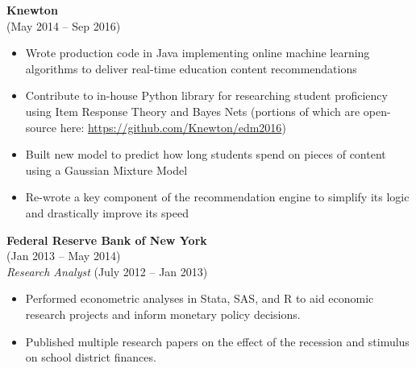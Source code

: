 \documentclass{res}
\begin{document}
\begin{resume}
  {\bf Knewton} \\ 
   \hspace{3pt} (May 2014 -- Sep 2016)
  \begin{itemize} \itemsep 2.0pt %
  \item Wrote production code in Java implementing online machine learning algorithms to deliver real-time education content recommendations
  \item Contribute to in-house Python library for researching student proficiency using Item Response Theory and Bayes Nets (portions of which are open-source here: \href{https://github.com/Knewton/edm2016}{https://github.com/Knewton/edm2016})
  \item Built new model to predict how long students spend on pieces of content using a Gaussian Mixture Model
  \item Re-wrote a key component of the recommendation engine to simplify its logic and drastically improve its speed
    
  \end{itemize}

  {\bf Federal Reserve Bank of New York}  \\
   \hspace{3pt} (Jan 2013 -- May 2014)\\
        {\it Research Analyst} \hspace{20pt} (July 2012 -- Jan 2013)
  \begin{itemize} \itemsep 2.0pt %
  \item Performed econometric analyses in Stata, SAS, and R to aid economic research projects and inform monetary policy decisions.
  \item Published multiple research papers on the effect of the recession and stimulus on school district finances.
  \end{itemize}
  

\end{resume}
\end{document}
